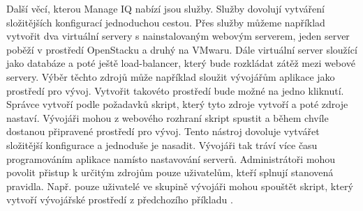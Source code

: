     Další věcí, kterou Manage IQ nabízí jsou služby. Služby dovolují vytváření složitějších konfigurací jednoduchou cestou. Přes služby můžeme například vytvořit dva virtuální servery s nainstalovaným webovým serverem, jeden server poběží v prostředí OpenStacku a druhý na VMwaru. Dále virtuální server sloužící jako databáze a poté ještě load-balancer, který bude rozkládat zátěž mezi webové servery. Výběr těchto zdrojů může například sloužit vývojářům aplikace jako prostředí pro vývoj. Vytvořit takovéto prostředí bude možné na jedno kliknutí. Správce vytvoří podle požadavků skript, který tyto zdroje vytvoří a poté zdroje nastaví. Vývojáři mohou z webového rozhraní skript spustit a během chvíle dostanou připravené prostředí pro vývoj. Tento nástroj dovoluje vytvářet složitější konfigurace a jednoduše je nasadit. Vývojáři tak tráví více času programováním aplikace namísto nastavování serverů. Administrátoři mohou povolit přistup k určitým zdrojům pouze uživatelům, kteří splnují stanovená pravidla. Např. pouze uživatelé ve skupině vývojáři mohou spouštět skript, který vytvoří vývojářské prostředí z předchozího příkladu \cite{lwn}.

